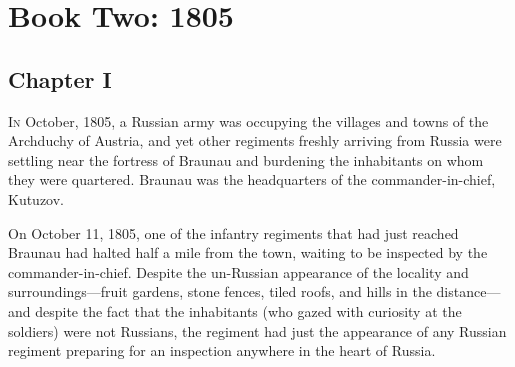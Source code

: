 \part*{Book Two: 1805}


\chapter*{Chapter I}
\ifaudio     {} \fi

\lettrine[lines=2, loversize=0.3, lraise=0]{\initfamily I}{n}
October, 1805, a Russian army was occupying the villages and
towns of the Archduchy of Austria, and yet other regiments
freshly arriving from Russia were settling near the fortress of
Braunau and burdening the inhabitants on whom they were
quartered. Braunau was the headquarters of the
commander-in-chief, Kutuzov.

On October 11, 1805, one of the infantry regiments that had just
reached Braunau had halted half a mile from the town, waiting to
be inspected by the commander-in-chief. Despite the un-Russian
appearance of the locality and sur\-roundings---fruit gardens,
stone fences, tiled roofs, and hills in the distance---and
despite the fact that the inhabitants (who gazed with curiosity
at the soldiers) were not Russians, the regiment had just the
appearance of any Russian regiment preparing for an inspection
anywhere in the heart of Russia.


